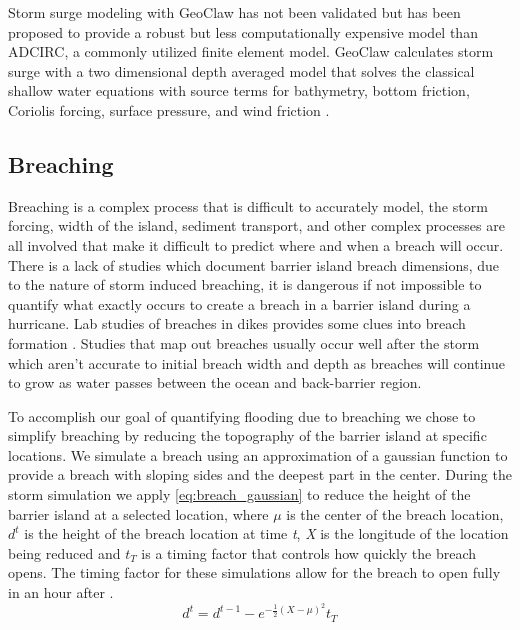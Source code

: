 \documentclass{coastal_paper}
\begin{document}
Storm surge modeling with GeoClaw has not been validated but has been proposed to provide a robust but less computationally expensive model than ADCIRC, a commonly utilized finite element model. GeoClaw calculates storm surge with a two dimensional depth averaged model that solves the classical shallow water equations with source terms for bathymetry, bottom friction, Coriolis forcing, surface pressure, and wind friction \citep{Mandli2014}. 

\subsection*{Breaching}
Breaching is a complex process that is difficult to accurately model, the storm forcing, width of the island, sediment transport, and other complex processes are all involved that make it difficult to predict where and when a breach will occur. There is a lack of studies which document barrier island breach dimensions, due to the nature of storm induced breaching, it is dangerous if not impossible to quantify what exactly occurs to create a breach in a barrier island during a hurricane. Lab studies of breaches in dikes provides some clues into breach formation \citep{Visser1999}. Studies that map out breaches usually occur well after the storm which aren't accurate to initial breach width and depth as breaches will continue to grow as water passes between the ocean and back-barrier region.

To accomplish our goal of quantifying flooding due to breaching we chose to simplify breaching by reducing the topography of the barrier island at specific locations. We simulate a breach using an approximation of a gaussian function to provide a breach with sloping sides and the deepest part in the center. During the storm simulation we apply \ref{eq:breach_gaussian} to reduce the height of the barrier island at a selected location, where \emph{$\mu$} is the center of the breach location, \emph{$d^t$} is the height of the breach location at time \emph{t}, \emph{X} is the longitude of the location being reduced and \emph{$t_T$} is a timing factor that controls how quickly the breach opens. The timing factor for these simulations allow for the breach to open fully in an hour after \citet{Visser1999}.
\begin{equation}
    d^t = d^{t-1} - e^{-\frac{1}{2}{(X - \mu)^2}}t_T
    \label{eq:breach_gaussian}
\end{equation}
\end{document}
